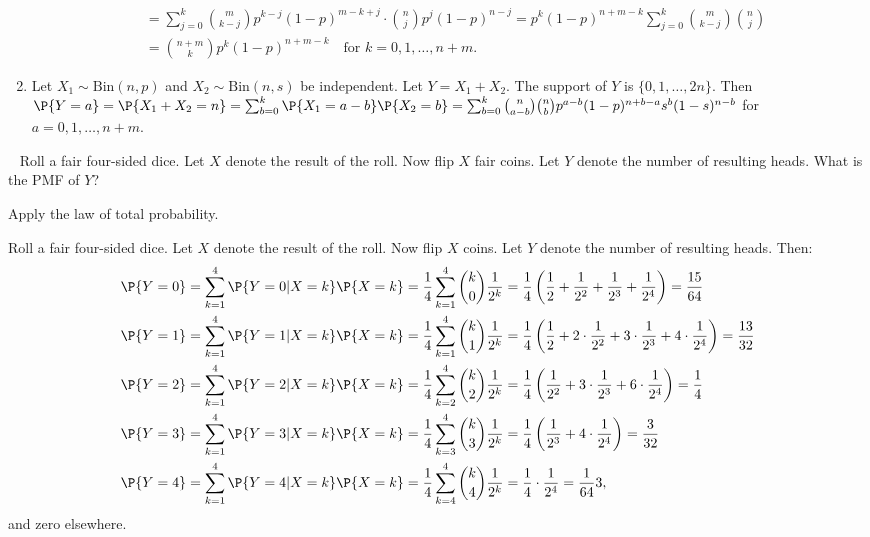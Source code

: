 \begin{exercise}
\begin{solution}
\begin{enumerate}
\begin{align*}
					 & = \sum_{j = 0}^k \binom{m}{k - j} p^{k - j} (1 - p)^{m - k + j} \cdot \binom{n}{j} p^j (1 - p)^{n - j} = p^k (1 - p)^{n + m - k} \sum_{j = 0}^k \binom{m}{k - j} \binom{n}{j} \\
					 & = \binom{n + m}{k} p^k (1 - p)^{n + m - k}\quad\text{for }k=0,1,\dots,n+m.
				 \end{align*}
 			\item Let $X_1\sim \text{Bin}(n,p)$ and $X_2\sim \text{Bin}(n,s)$ be independent. Let $Y=X_1+X_2$. The support of $Y$ is $\{0, 1, \ldots, 2n\}$. Then $\P{Y = a} = \P{X_1 + X_2 = n} = \sum_{b = 0}^k \P{X_1 = a - b} \P{X_2 = b} = \sum_{b = 0}^k \binom{n}{a - b} \binom{n}{b} p^{a - b} (1 - p)^{n + b - a} s^b (1 - s)^{n - b}$ for $a=0,1,\dots,n+m$.
 		\end{enumerate}
 	\end{solution}
\end{exercise}

\begin{exercise}~
	Roll a fair four-sided dice. Let $X$ denote the result of the roll. Now flip $X$ fair coins. Let $Y$ denote the number of resulting heads. What is the PMF of $Y$?
	\begin{hint}
		Apply the law of total probability.
	\end{hint}
 	\begin{solution}
		Roll a fair four-sided dice. Let $X$ denote the result of the roll. Now flip $X$ coins. Let $Y$ denote the number of resulting heads. Then:
 		\begin{align*}
 			\P{Y = 0} & = \sum_{k = 1}^4 \P{Y = 0 | X = k} \P{X = k} = \frac{1}{4} \sum_{k = 1}^4 \binom{k}{0} \frac{1}{2^k} = \frac{1}{4} \left(\frac{1}{2} + \frac{1}{2^2} + \frac{1}{2^3} + \frac{1}{2^4}\right) = \frac{15}{64} \\
 			\P{Y = 1} & = \sum_{k = 1}^4 \P{Y = 1 | X = k} \P{X = k} = \frac{1}{4} \sum_{k = 1}^4 \binom{k}{1} \frac{1}{2^k} = \frac{1}{4} \left(\frac{1}{2} + 2 \cdot \frac{1}{2^2} + 3 \cdot \frac{1}{2^3} + 4 \cdot \frac{1}{2^4}\right) = \frac{13}{32} \\
 			\P{Y = 2} & = \sum_{k = 1}^4 \P{Y = 2 | X = k} \P{X = k} = \frac{1}{4} \sum_{k = 2}^4 \binom{k}{2} \frac{1}{2^k} = \frac{1}{4} \left(\frac{1}{2^2} + 3 \cdot \frac{1}{2^3} + 6 \cdot \frac{1}{2^4}\right) = \frac{1}{4} \\
 			\P{Y = 3} & = \sum_{k = 1}^4 \P{Y = 3 | X = k} \P{X = k} = \frac{1}{4} \sum_{k = 3}^4 \binom{k}{3} \frac{1}{2^k} = \frac{1}{4} \left(\frac{1}{2^3} + 4 \cdot \frac{1}{2^4}\right) = \frac{3}{32} \\
 			\P{Y = 4} & = \sum_{k = 1}^4 \P{Y = 4 | X = k} \P{X = k} = \frac{1}{4} \sum_{k = 4}^4 \binom{k}{4} \frac{1}{2^k} = \frac{1}{4} \cdot \frac{1}{2^4} = \frac{1}{64}3,
 		\end{align*} 
		and zero elsewhere.
 	\end{solution}
\end{exercise}

